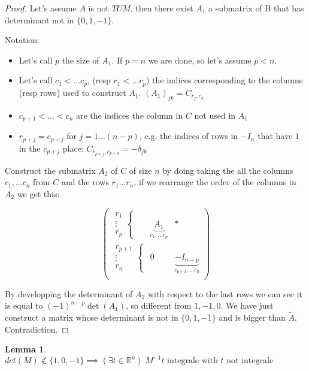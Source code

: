 \documentclass[11pt]{article}
\newtheorem{thm}{Lemma}
\begin{document}
\begin{proof}
Let's assume \(A\) is not \(TUM\), then there exist \(A_1\) a submatrix of B that has determinant not in \(\{0, 1, -1\}\).

Notation:
\begin{itemize}
\item Let's call \(p\) the size of \(A_1\). If \(p = n\) we are done, so let's assume \(p < n\).
\item Let's call \(c_1 < \ldots c_p\), (resp \(r_1 < \ldots r_p\)) the indices corresponding to the columns (resp rows) used to construct \(A_1\).
\((A_1)_{jk} = C_{r_j, c_k}\)
\item \(c_{p+1} < \ldots < c_n\) are the indices the column in \(C\) not used in \(A_1\)
\item \(r_{p+j} = c_{p+j}\) for \(j = 1 \ldots (n-p)\), e.g.  the indices of rows in \(-I_n\) that have \(1\) in the \(c_{p+j}\) place:
\(C_{r_{p+j}, c_{p+k}} = -\delta_{jk}\)
\end{itemize}

Construct the submatrix \(A_2\) of \(C\) of size \(n\) by doing taking the all the columns \(c_1, \ldots c_n\) from \(C\) and the rows \(r_1 \ldots r_n\), if we rearrange the order of the columns in \(A_2\) we get this:

\[    \begin{pmatrix}    \begin{array}{c}r_1 \\ \vdots\\ r_p \end{array} \left\{\right. &  \underbrace{A_1}_{c_1, \ldots c_p} & * \\   \begin{array}{c}r_{p+1} \\ \vdots\\ r_n \end{array} \left\{\right. &  0 & \underbrace{-I_{n-p}}_{c_{p+1}, \ldots c_n} \\    \end{pmatrix}    \]



By developping the determinant of \(A_2\) with respect to the last rows we can see it is equal to \((-1)^{n-p}\det(A_1)\), so different from \(1, -1, 0\).
We have just construct a matrix whose determinant is not in  \(\{0, 1, -1\}\) and is bigger than \(\tilde A\). Contradiction.
\end{proof}


\begin{thm}
\(det(M) \not \in \{1, 0, -1\} \implies (\exists t \in \mathbb R^n)\; M^{-1}t \text{ integrale with } t \text{ not integrale }\)
\end{thm}
\end{document}
